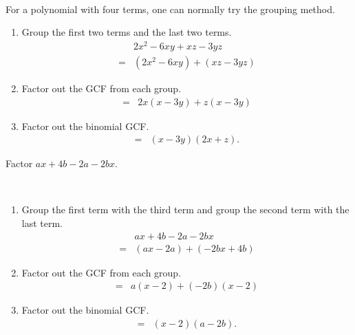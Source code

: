 \documentclass[
  en,11pt]{elegantbook}
\let\BeginKnitrBlock\begin \let\EndKnitrBlock\end
\begin{document}
\BeginKnitrBlock{solution}
{}~

For a polynomial with four terms, one can normally try the grouping method.

\begin{enumerate}
\def\labelenumi{\arabic{enumi}.}

\item
  Group the first two terms and the last two terms.
  \[
   \begin{aligned}
   &2x^2-6xy+xz-3yz\\
   =&(2x^2-6xy)+(xz-3yz)
   \end{aligned}
  \]
\item
  Factor out the GCF from each group.\\
  \[
   \begin{aligned}
   =&2x(x-3y)+z(x-3y)
   \end{aligned}
  \]
\item
  Factor out the binomial GCF.
  \[
   \begin{aligned}
   =&(x-3y)(2x+z).
   \end{aligned}
  \]
\end{enumerate}
\EndKnitrBlock{solution}

\BeginKnitrBlock{example}
\protect\hypertarget{exm:unnamed-chunk-13}{}{\label{exm:unnamed-chunk-13} }
Factor \(ax+4b-2a-2bx\).
\EndKnitrBlock{example}

\BeginKnitrBlock{solution}
{}\\

\begin{enumerate}
\def\labelenumi{\arabic{enumi}.}

\item
  Group the first term with the third term and group the second term with the last term.
  \[
   \begin{aligned}
   &ax+4b-2a-2bx\\
   =&(ax-2a)+(-2bx+4b)
   \end{aligned}
   \]
\item
  Factor out the GCF from each group.
  \[
   \begin{aligned}
   =&a(x-2)+(-2b)(x-2)
   \end{aligned}
   \]
\item
  Factor out the binomial GCF.
  \[
   \begin{aligned}
   =&(x-2)(a-2b).
   \end{aligned}
   \]
\end{enumerate}
\EndKnitrBlock{solution}
\end{document}
